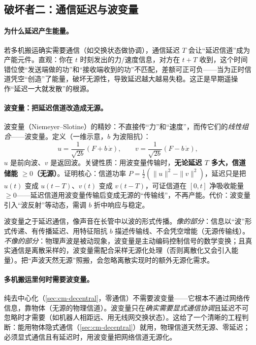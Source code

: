 \subsection{破坏者二：通信延迟与波变量}
\label{sec:cm-passivity-wave}
\paragraph{为什么延迟产生能量。}
若多机搬运确实需要通信（如交换状态做协调），通信延迟 $T$ 会让“延迟信道”成为产能元件。直观：你在 $t$ 时刻发出的力/速度信息，对方在 $t+T$ 收到，这个时间错位使“发送端做的功”和“接收端收到的功”不匹配，差额可正可负——当为正时信道凭空“创造”了能量，破坏无源性，导致延迟越大越易失稳。这正是早期遥操作“延迟一大就发散”的根源。

\paragraph{波变量：把延迟信道改造成无源。}
波变量（Niemeyer--Slotine\cite{niemeyer1991stable}）的精妙：不直接传“力”和“速度”，而传它们的\emph{线性组合}——波变量。定义（一维示意，$b$ 为波阻抗）：
\begin{equation}
  u=\frac{1}{\sqrt{2b}}(F+b\,\dot x),\qquad v=\frac{1}{\sqrt{2b}}(F-b\,\dot x),
  \label{eq:cm-wave}
\end{equation}
$u$ 是前向波、$v$ 是返回波。关键性质：用波变量传输时，\textbf{无论延迟 $T$ 多大，信道储能 $\ge 0$（无源）}。证明核心：信道功率 $P=\frac12(\|u\|^2-\|v\|^2)$，延迟只是把 $u(t)$ 变成 $u(t-T)$、$v(t)$ 变成 $v(t-T)$，可证信道在 $[0,t]$ 净吸收能量 $\ge 0$——延迟信道用波变量传输后变成无源的“传输线”，不再产能。代价：波变量引入“波反射”等动态，需调 $b$ 折中响应与稳定。

\begin{note}
波变量之于延迟通信，像声音在长管中以波的形式传播。\emph{像的部分}：信息以“波”形式传递、有传播延迟、用特征阻抗 $b$ 描述传输线、不会凭空增能（无源传输线）。\emph{不像的部分}：物理声波是被动现象，波变量是主动编码控制信号的数学变换；且真实通信是离散采样的，波变量需配合采样无源化处理（否则离散化又会引入能量）。把“声波天然无源”照搬，会忽略离散实现时的额外无源化需求。
\end{note}

\paragraph{多机搬运里何时需要波变量。}
纯去中心化（\cref{sec:cm-decentral}，零通信）不需要波变量——它根本不通过网络传信息，靠物体（无源的物理信道）。波变量只在\emph{确实需要显式通信协调}且延迟不可忽略时才需要（如机器人相距远、用无线网交换状态）。这给了一个清晰的工程判断：能用物体隐式通信（\cref{sec:cm-decentral}）就用，物理信道天然无源、零延迟；必须显式通信且有延迟时，用波变量把网络信道无源化。

